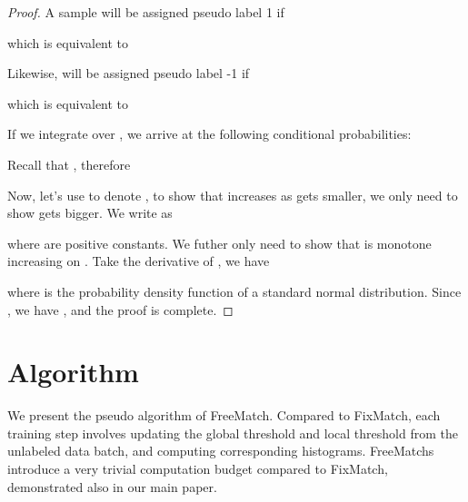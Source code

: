 \documentclass{article} \usepackage{iclr2023_conference,times}
\theoremstyle{plain}
\theoremstyle{definition}
\theoremstyle{remark}
\newcommand{\ourmethod}{FreeMatch\xspace}
\begin{document}
\begin{proof}


A sample  will be assigned pseudo label 1 if 

which is equivalent to

Likewise,  will be assigned pseudo label -1 if

which is equivalent to

If we integrate over , we arrive at the following conditional probabilities:

Recall that , therefore

Now, let's use  to denote , to show that  increases as  gets smaller, we only need to show  gets bigger. We write  as

where  are positive constants. We futher only need to show that  is monotone increasing on . Take the derivative of , we have

where  is the probability density function of a standard normal distribution. Since , we have , and the proof is complete.

\end{proof}

\section{Algorithm}

We present the pseudo algorithm of \ourmethod. Compared to FixMatch, each training step involves updating the global threshold and local threshold from the unlabeled data batch, and computing corresponding histograms. FreeMatchs introduce a very trivial computation budget compared to FixMatch, demonstrated also in our main paper.
\end{document}
